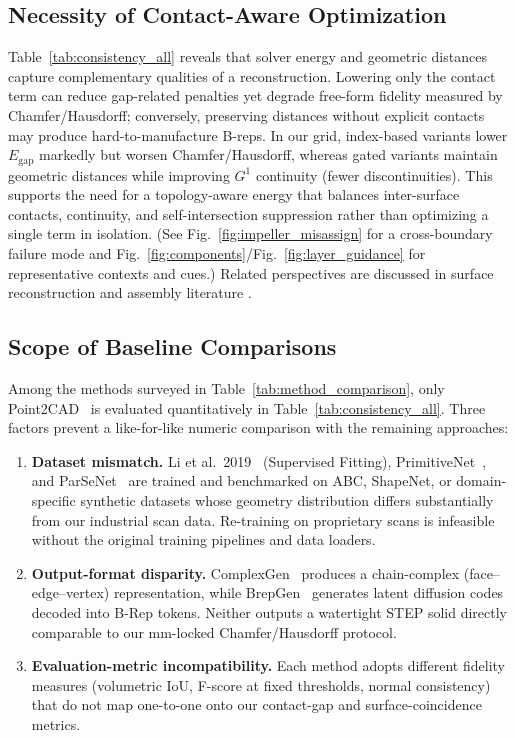 \documentclass{ieeeaccess}
\begin{document}
\subsection{Necessity of Contact-Aware Optimization}
Table~\ref{tab:consistency_all} reveals that solver energy and geometric
distances capture complementary qualities of a reconstruction.
Lowering only the contact term can reduce gap-related penalties
yet degrade free-form fidelity measured by Chamfer/Hausdorff;
conversely, preserving distances without explicit contacts may
produce hard-to-manufacture B-reps. In our grid, index-based
variants lower $E_{\text{gap}}$ markedly but worsen Chamfer/Hausdorff,
whereas gated variants maintain geometric distances while
improving $G^1$ continuity (fewer discontinuities). This supports
the need for a topology-aware energy that balances inter-surface
contacts, continuity, and self-intersection suppression rather than
optimizing a single term in isolation. (See Fig.~\ref{fig:impeller_misassign}
for a cross-boundary failure mode and Fig.~\ref{fig:components}/Fig.~\ref{fig:layer_guidance}
for representative contexts and cues.) Related perspectives are discussed in surface reconstruction and assembly literature \cite{b13,b14,b22}.

\subsection{Scope of Baseline Comparisons}
Among the methods surveyed in Table~\ref{tab:method_comparison}, only
Point2CAD~\cite{b2} is evaluated quantitatively in
Table~\ref{tab:consistency_all}. Three factors prevent a like-for-like
numeric comparison with the remaining approaches:

\begin{enumerate}
  \item \textbf{Dataset mismatch.}
        Li et al.\ 2019~\cite{b27} (Supervised Fitting), PrimitiveNet~\cite{b28},
        and ParSeNet~\cite{b19}
        are trained and benchmarked on
        ABC, ShapeNet, or domain-specific synthetic datasets whose
        geometry distribution differs substantially from our
        industrial scan data.
        Re-training on proprietary scans is infeasible without the
        original training pipelines and data loaders.
  \item \textbf{Output-format disparity.}
        ComplexGen~\cite{b1} produces a chain-complex (face--edge--vertex)
        representation, while BrepGen~\cite{b4} generates latent
        diffusion codes decoded into B-Rep tokens.
        Neither outputs a watertight STEP solid directly comparable
        to our mm-locked Chamfer/Hausdorff protocol.
  \item \textbf{Evaluation-metric incompatibility.}
        Each method adopts different fidelity measures
        (volumetric IoU, F-score at fixed thresholds, normal
        consistency) that do not map one-to-one onto our
        contact-gap and surface-coincidence metrics.
\end{enumerate}
\end{document}
